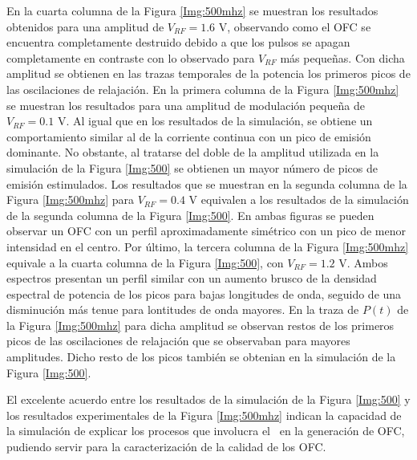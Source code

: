 		En la cuarta columna de la Figura \ref{Img:500mhz} se muestran los resultados obtenidos para una amplitud de $V_{RF} = 1.6$ V, observando como el OFC se encuentra completamente destruido debido a que los pulsos se apagan completamente en contraste con lo observado para $V_{RF}$ más pequeñas. Con dicha amplitud se obtienen en las trazas temporales de la potencia los primeros picos de las oscilaciones de relajaci\'on. En la primera columna de la Figura \ref{Img:500mhz} se muestran los resultados para una amplitud de modulación pequeña de $V_{RF} = 0.1$ V. Al igual que en los resultados de la simulación, se obtiene un comportamiento similar al de la corriente continua con un pico de emisi\'on dominante. No obstante, al tratarse del doble de la amplitud utilizada en la simulaci\'on de la Figura \ref{Img:500} se obtienen un mayor n\'umero de picos de emisión estimulados. Los resultados que se muestran en la segunda columna de la Figura \ref{Img:500mhz}  para $V_{RF} = 0.4$ V equivalen a los resultados de la simulación de la segunda columna de la Figura \ref{Img:500}. En ambas figuras se pueden observar un OFC con un perfil aproximadamente sim\'etrico con un pico de menor intensidad en el centro. Por \'ultimo, la tercera columna de la Figura \ref{Img:500mhz} equivale a la cuarta columna de la Figura \ref{Img:500}, con $V_{RF} = 1.2$ V. Ambos espectros presentan un perfil similar con un aumento brusco de la densidad espectral de potencia de los picos para bajas longitudes de onda, seguido de una disminuci\'on m\'as tenue para lontitudes de onda mayores. En la traza de $P(t)$ de la Figura \ref{Img:500mhz} para dicha amplitud se observan restos de los primeros picos de las oscilaciones de relajaci\'on que se observaban para mayores amplitudes. Dicho resto de los picos tambi\'en se obtenian en la simulaci\'on de la Figura \ref{Img:500}.

	El excelente acuerdo entre los resultados de la simulaci\'on de la Figura \ref{Img:500} y los resultados experimentales de la Figura \ref{Img:500mhz} indican la capacidad de la simulaci\'on de explicar los procesos que involucra el \gs\ en la generaci\'on de OFC, pudiendo servir para la caracterizaci\'on de la calidad de los OFC.
